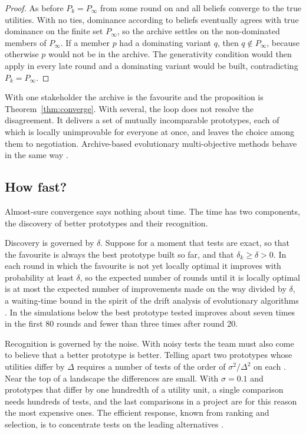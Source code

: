 \documentclass[10pt,twocolumn]{article}
\newcommand{\Pk}{P_k}
\theoremstyle{definition}
\begin{document}
\begin{proof}
As before $\Pk=P_\infty$ from some round on and all beliefs converge to the true utilities. With no ties, dominance according to beliefs eventually agrees with true dominance on the finite set $P_\infty$, so the archive settles on the non-dominated members of $P_\infty$. If a member $p$ had a dominating variant $q$, then $q\notin P_\infty$, because otherwise $p$ would not be in the archive. The generativity condition would then apply in every late round and a dominating variant would be built, contradicting $\Pk=P_\infty$.
\end{proof}

With one stakeholder the archive is the favourite and the proposition is Theorem~\ref{thm:converge}. With several, the loop does not resolve the disagreement. It delivers a set of mutually incomparable prototypes, each of which is locally unimprovable for everyone at once, and leaves the choice among them to negotiation. Archive-based evolutionary multi-objective methods behave in the same way \citep{laumanns2002}.

\subsection{How fast?}
\label{sec:rates}

Almost-sure convergence says nothing about time. The time has two components, the discovery of better prototypes and their recognition.

Discovery is governed by $\delta$. Suppose for a moment that tests are exact, so that the favourite is always the best prototype built so far, and that $\delta_k\ge\delta>0$. In each round in which the favourite is not yet locally optimal it improves with probability at least $\delta$, so the expected number of rounds until it is locally optimal is at most the expected number of improvements made on the way divided by $\delta$, a waiting-time bound in the spirit of the drift analysis of evolutionary algorithms \citep{heyao2001}. In the simulations below the best prototype tested improves about seven times in the first 80 rounds and fewer than three times after round 20.

Recognition is governed by the noise. With noisy tests the team must also come to believe that a better prototype is better. Telling apart two prototypes whose utilities differ by $\Delta$ requires a number of tests of the order of $\sigma^2/\Delta^2$ on each \citep{evendar2006, mannor2004}. Near the top of a landscape the differences are small. With $\sigma=0.1$ and prototypes that differ by one hundredth of a utility unit, a single comparison needs hundreds of tests, and the last comparisons in a project are for this reason the most expensive ones. The efficient response, known from ranking and selection, is to concentrate tests on the leading alternatives \citep{chen2000}.
\end{document}
